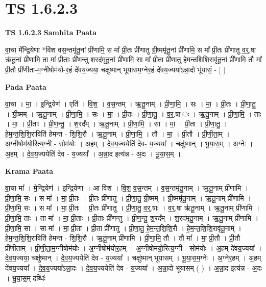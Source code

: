 \documentclass[17pt]{extarticle}
\begin{document}
\section{ TS 1.6.2.3 }

\textbf{TS 1.6.2.3 } \newline
\textbf{Samhita Paata} \newline

वा॒चा मे᳚न्द्रि॒येणा *वि॑श वस॒न्तमृ॑तू॒नां प्री॑णामि॒ स मा᳚ प्री॒तः प्री॑णातु ग्री॒ष्ममृ॑तू॒नां प्री॑णामि॒ स मा᳚ प्री॒तः प्री॑णातु व॒र्॒.षा ऋ॑तू॒नां प्री॑णामि॒ ता मा᳚ प्री॒ताः प्री॑णन्तु श॒रद॑मृतू॒नां प्री॑णामि॒ सा मा᳚ प्री॒ता प्री॑णातु हेमन्तशिशि॒रावृ॑तू॒नां प्री॑णामि॒ तौ मा᳚ प्री॒तौ प्री॑णीता-म॒ग्नीषोम॑यो-र॒हं दे॑वय॒ज्यया॒ चक्षु॑ष्मान् भूयासम॒ग्नेर॒हं दे॑वय॒ज्यया᳚ऽन्ना॒दो भू॑यासं॒ - [ ] \newline

\textbf{Pada Paata} \newline

वा॒चा । मा॒ । इ॒न्द्रि॒येण॑ । एति॑ । वि॒श॒ । व॒स॒न्तम् । ऋ॒तू॒नाम् । प्री॒णा॒मि॒ । सः । मा॒ । प्री॒तः । प्री॒णा॒तु॒ । ग्री॒ष्मम् । ऋ॒तू॒नाम् । प्री॒णा॒मि॒ । सः । मा॒ । प्री॒तः । प्री॒णा॒तु॒ । व॒र्॒.षा ः । ऋ॒तू॒नाम् । प्री॒णा॒मि॒ । ताः । मा॒ । प्री॒ताः । प्री॒ण॒न्तु॒ । श॒रद᳚म् । ऋ॒तू॒नाम् । प्री॒णा॒मि॒ । सा । मा॒ । प्री॒ता । प्री॒णा॒तु॒ । हे॒म॒न्त॒शि॒शि॒राविति॑ हेमन्त - शि॒शि॒रौ । ऋ॒तू॒नाम् । प्री॒णा॒मि॒ । तौ । मा॒ । प्री॒तौ । प्री॒णी॒ता॒म् । अ॒ग्नीषोम॑यो॒रित्य॒ग्नी - सोम॑योः । अ॒हम् । दे॒व॒य॒ज्ययेति॑ देव- य॒ज्यया᳚ । चक्षु॑ष्मान् । भू॒या॒स॒म् । अ॒ग्नेः । अ॒हम् । दे॒व॒य॒ज्ययेति॑ देव - य॒ज्यया᳚ । अ॒न्ना॒द इत्य॑न्न - अ॒दः । भू॒या॒स॒म् ।  \newline


\textbf{Krama Paata} \newline

वा॒चा मा᳚ । मे॒न्द्रि॒येण॑ । इ॒न्द्रि॒येणा । आ वि॑श । वि॒श॒ व॒स॒न्तम् । व॒स॒न्तमृ॑तू॒नाम् । ऋ॒तू॒नाम् प्री॑णामि । प्री॒णा॒मि॒ सः । स मा᳚ । मा॒ प्री॒तः । प्री॒तः प्री॑णातु । प्री॒णा॒तु॒ ग्री॒ष्मम् । ग्री॒ष्ममृ॑तू॒नाम् । ऋ॒तू॒नाम् प्री॑णामि । प्री॒णा॒मि॒ सः । स मा᳚ । मा॒ प्री॒तः । प्री॒तः प्री॑णातु । प्री॒णा॒तु॒ व॒र्॒.षाः । व॒र्॒.षा ऋ॑तू॒नाम् । ऋ॒तू॒नाम् प्री॑णामि । प्री॒णा॒मि॒ ताः । ता मा᳚ । मा॒ प्री॒ताः । प्री॒ताः प्री॑णन्तु । प्री॒ण॒न्तु॒ श॒रद᳚म् । श॒रद॑मृतू॒नाम् । ऋ॒तू॒नाम् प्री॑णामि । प्री॒णा॒मि॒ सा । सा मा᳚ । मा॒ प्री॒ता । प्री॒ता प्री॑णातु । प्री॒णा॒तु॒ हे॒म॒न्त॒शि॒शि॒रौ । हे॒म॒न्त॒शि॒शि॒रावृ॑तू॒नाम् । हे॒म॒न्त॒शि॒शि॒राविति॑ हेमन्त - शि॒शि॒रौ । ऋ॒तू॒नाम् प्री॑णामि । प्री॒णा॒मि॒ तौ । तौ मा᳚ । मा॒ प्री॒तौ । प्री॒तौ प्री॑णीताम् । प्री॒णी॒ता॒म॒ग्नीषोम॑योः । अ॒ग्नीषोम॑योर॒हम् । अ॒ग्नीषोम॑यो॒रित्य॒ग्नी - सोम॑योः । अ॒हम् दे॑वय॒ज्यया᳚ । दे॒व॒य॒ज्यया॒ चक्षु॑ष्मान् । दे॒व॒य॒ज्ययेति॑ देव - य॒ज्यया᳚ । चक्षु॑ष्मान् भूयासम् । भू॒या॒स॒म॒ग्नेः । अ॒ग्नेर॒हम् । अ॒हम् दे॑वय॒ज्यया᳚ । दे॒व॒य॒ज्यया᳚ऽन्ना॒दः । दे॒व॒य॒ज्ययेति॑ देव - य॒ज्यया᳚ । अ॒न्ना॒दो भू॑यासम् ( ) । अ॒न्ना॒द इत्य॑न्न - अ॒दः । भू॒या॒स॒म् दब्धिः॑ \newline
\end{document}
